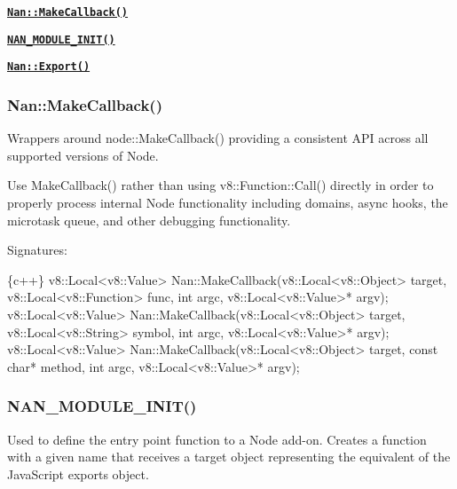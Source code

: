 
\begin{DoxyItemize}
\item \href{#api_nan_make_callback}{\tt {\bfseries {\ttfamily Nan\+::\+Make\+Callback()}}}
\item \href{#api_nan_module_init}{\tt {\bfseries {\ttfamily N\+A\+N\+\_\+\+M\+O\+D\+U\+L\+E\+\_\+\+I\+N\+I\+T()}}}
\item \href{#api_nan_export}{\tt {\bfseries {\ttfamily Nan\+::\+Export()}}}
\end{DoxyItemize}

\label{_api_nan_make_callback}%
 \subsubsection*{Nan\+::\+Make\+Callback()}

Wrappers around {\ttfamily node\+::\+Make\+Callback()} providing a consistent A\+PI across all supported versions of Node.

Use {\ttfamily Make\+Callback()} rather than using {\ttfamily v8\+::\+Function\+::\+Call()} directly in order to properly process internal Node functionality including domains, async hooks, the microtask queue, and other debugging functionality.

Signatures\+:


\begin{DoxyCode}
\{c++\}
v8::Local<v8::Value> Nan::MakeCallback(v8::Local<v8::Object> target,
                                       v8::Local<v8::Function> func,
                                       int argc,
                                       v8::Local<v8::Value>* argv);
v8::Local<v8::Value> Nan::MakeCallback(v8::Local<v8::Object> target,
                                       v8::Local<v8::String> symbol,
                                       int argc,
                                       v8::Local<v8::Value>* argv);
v8::Local<v8::Value> Nan::MakeCallback(v8::Local<v8::Object> target,
                                       const char* method,
                                       int argc,
                                       v8::Local<v8::Value>* argv);
\end{DoxyCode}


\label{_api_nan_module_init}%
 \subsubsection*{N\+A\+N\+\_\+\+M\+O\+D\+U\+L\+E\+\_\+\+I\+N\+I\+T()}

Used to define the entry point function to a Node add-\/on. Creates a function with a given {\ttfamily name} that receives a {\ttfamily target} object representing the equivalent of the Java\+Script {\ttfamily exports} object.

